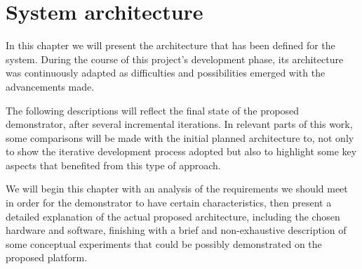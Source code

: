 \chapter{System architecture} \label{chap:sys-arch}

In this chapter we will present the architecture that has been defined for the system.
During the course of this project's development phase, its architecture was continuously adapted as difficulties and possibilities emerged with the advancements made.

The following descriptions will reflect the final state of the proposed demonstrator, after several incremental iterations.
In relevant parts of this work, some comparisons will be made with the initial planned architecture to, not only to show the iterative development process adopted but also to highlight some key aspects that benefited from this type of approach.

We will begin this chapter with an analysis of the requirements we should meet in order for the demonstrator to have certain characteristics, then present a detailed explanation of the actual proposed architecture, including the chosen hardware and software, finishing with a brief and non-exhaustive description of some conceptual experiments that could be possibly demonstrated on the proposed platform.









